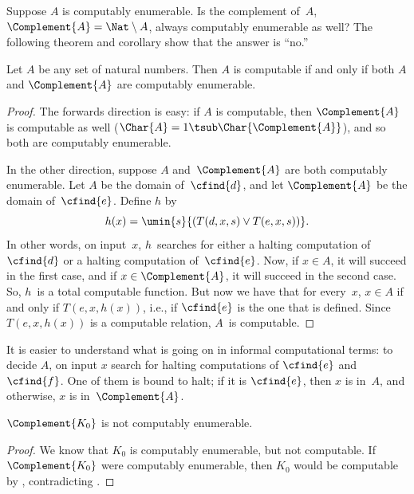 \documentclass[../../../include/open-logic-section]{subfiles}
\begin{document}

Suppose $A$ is computably enumerable. Is the complement of~$A$,
$\Complement{A} = \Nat \setminus A$, always computably enumerable
as well? The following theorem and corollary show that the answer is
``no.''

\begin{thm}
Let $A$ be any set of natural numbers. Then $A$ is computable if and
only if both $A$ and $\Complement{A}$ are computably enumerable.
\end{thm}

\begin{proof}
The forwards direction is easy: if $A$ is computable, then
$\Complement{A}$ is computable as well ($\Char{A} = 1 \tsub
\Char{\Complement{A}}$), and so both are computably enumerable.

In the other direction, suppose $A$ and~$\Complement{A}$ are both
computably enumerable. Let $A$ be the domain of~$\cfind{d}$, and let
$\Complement{A}$ be the domain of~$\cfind{e}$. Define $h$ by
\[
h(x) = \umin{s}{(T(d,x,s) \lor T(e,x,s))}.
\]
In other words, on input~$x$, $h$~searches for either a halting
computation of~$\cfind{d}$ or a halting computation of~$\cfind{e}$.
Now, if $x \in A$, it will succeed in the first case, and if $x \in
\Complement{A}$, it will succeed in the second case. So, $h$~is a
total computable function. But now we have that for every~$x$, $x \in
A$ if and only if $T(e, x, h(x))$, i.e., if $\cfind{e}$ is the one
that is defined. Since $T(e, x, h(x))$ is a computable relation,
$A$~is computable.
\end{proof}

\begin{explain}
It is easier to understand what is going on in informal computational
terms: to decide $A$, on input $x$ search for halting computations of
$\cfind{e}$ and $\cfind{f}$. One of them is bound to halt; if it is $\cfind{e}$,
then $x$ is in~$A$, and otherwise, $x$ is in~$\Complement{A}$.
\end{explain}

\begin{cor}
$\Complement{K_0}$ is not computably enumerable.
\end{cor}

\begin{proof}
We know that $K_0$ is computably enumerable, but not computable. If
$\Complement{K_0}$ were computably enumerable, then $K_0$ would be
computable by , contradicting .
\end{proof}
\end{document}
